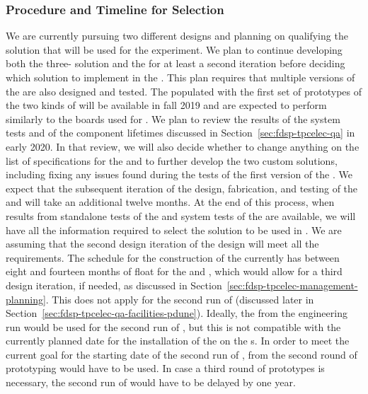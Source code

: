 \subsubsection{Procedure and Timeline for  Selection}
\label{sec:fdsp-tpcelec-design-femb-selection}

We are currently pursuing two different  designs and 
planning on qualifying the   solution that 
will be used for the  experiment.
We plan to continue developing both the three- 
solution and the   for at least a second 
iteration before deciding which  solution to 
implement in the  . This plan requires
that multiple versions of the  are also designed 
and tested. The  populated with the first set of prototypes of 
the two kinds of  will be available in fall 2019 
and are expected to perform similarly to the
boards used for . We plan to review the results 
of the system tests and of the component lifetimes discussed 
in Section~\ref{sec:fdsp-tpcelec-qa} in early 2020.
In that review, we will also decide whether to change anything on 
the list of specifications for the  and to further develop
the two custom  solutions, including fixing any 
issues found during the tests of the first version of the . 
We expect that the subsequent iteration
of the design, fabrication, and testing of the  and
 will take an additional twelve months. At the end 
of this process, when results from standalone tests of the
 and system tests of the  are
available, we will have all the information required to select the 
solution to be used in . We are assuming that the second design iteration of
the  design will meet all the  requirements.
The schedule for the construction of the  
currently has between eight and fourteen months of float for the
 and , which would allow for a third design
iteration, if needed, as discussed
in Section~\ref{sec:fdsp-tpcelec-management-planning}. This does
not apply for the second run of  (discussed
later in Section~\ref{sec:fdsp-tpcelec-qa-facilities-pdune}).
Ideally, the  from the engineering run would be used
for the second run of , but this is not compatible
with the currently planned date for the installation of the 
on the s. In order to meet the current goal for the starting
date of the second run of ,  from the
second round of prototyping would have to be used. In case a
third round of prototypes is necessary, the second run of 
 would have to be delayed by one year.


